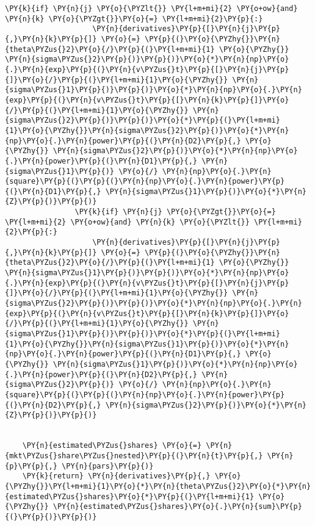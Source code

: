 \begin{tcolorbox}[breakable, size=fbox, boxrule=1pt, pad at break*=1mm,colback=cellbackground, colframe=cellborder]
\begin{Verbatim}[commandchars=\\\{\}]
                \PY{k}{if} \PY{n}{j} \PY{o}{\PYZlt{}} \PY{l+m+mi}{2} \PY{o+ow}{and} \PY{n}{k} \PY{o}{\PYZgt{}}\PY{o}{=} \PY{l+m+mi}{2}\PY{p}{:}
                    \PY{n}{derivatives}\PY{p}{[}\PY{n}{j}\PY{p}{,}\PY{n}{k}\PY{p}{]} \PY{o}{=} \PY{p}{(}\PY{o}{\PYZhy{}}\PY{n}{theta\PYZus{}2}\PY{o}{/}\PY{p}{(}\PY{l+m+mi}{1} \PY{o}{\PYZhy{}} \PY{n}{sigma\PYZus{}2}\PY{p}{)}\PY{p}{)}\PY{o}{*}\PY{n}{np}\PY{o}{.}\PY{n}{exp}\PY{p}{(}\PY{n}{v\PYZus{}t}\PY{p}{[}\PY{n}{j}\PY{p}{]}\PY{o}{/}\PY{p}{(}\PY{l+m+mi}{1}\PY{o}{\PYZhy{}} \PY{n}{sigma\PYZus{}1}\PY{p}{)}\PY{p}{)}\PY{o}{*}\PY{n}{np}\PY{o}{.}\PY{n}{exp}\PY{p}{(}\PY{n}{v\PYZus{}t}\PY{p}{[}\PY{n}{k}\PY{p}{]}\PY{o}{/}\PY{p}{(}\PY{l+m+mi}{1}\PY{o}{\PYZhy{}} \PY{n}{sigma\PYZus{}2}\PY{p}{)}\PY{p}{)}\PY{o}{*}\PY{p}{(}\PY{l+m+mi}{1}\PY{o}{\PYZhy{}}\PY{n}{sigma\PYZus{}2}\PY{p}{)}\PY{o}{*}\PY{n}{np}\PY{o}{.}\PY{n}{power}\PY{p}{(}\PY{n}{D2}\PY{p}{,} \PY{o}{\PYZhy{}} \PY{n}{sigma\PYZus{}2}\PY{p}{)}\PY{o}{*}\PY{n}{np}\PY{o}{.}\PY{n}{power}\PY{p}{(}\PY{n}{D1}\PY{p}{,} \PY{n}{sigma\PYZus{}1}\PY{p}{)} \PY{o}{/} \PY{n}{np}\PY{o}{.}\PY{n}{square}\PY{p}{(}\PY{p}{(}\PY{n}{np}\PY{o}{.}\PY{n}{power}\PY{p}{(}\PY{n}{D1}\PY{p}{,} \PY{n}{sigma\PYZus{}1}\PY{p}{)}\PY{o}{*}\PY{n}{Z}\PY{p}{)}\PY{p}{)}
                \PY{k}{if} \PY{n}{j} \PY{o}{\PYZgt{}}\PY{o}{=} \PY{l+m+mi}{2} \PY{o+ow}{and} \PY{n}{k} \PY{o}{\PYZlt{}} \PY{l+m+mi}{2}\PY{p}{:}
                    \PY{n}{derivatives}\PY{p}{[}\PY{n}{j}\PY{p}{,}\PY{n}{k}\PY{p}{]} \PY{o}{=} \PY{p}{(}\PY{o}{\PYZhy{}}\PY{n}{theta\PYZus{}2}\PY{o}{/}\PY{p}{(}\PY{l+m+mi}{1} \PY{o}{\PYZhy{}} \PY{n}{sigma\PYZus{}1}\PY{p}{)}\PY{p}{)}\PY{o}{*}\PY{n}{np}\PY{o}{.}\PY{n}{exp}\PY{p}{(}\PY{n}{v\PYZus{}t}\PY{p}{[}\PY{n}{j}\PY{p}{]}\PY{o}{/}\PY{p}{(}\PY{l+m+mi}{1}\PY{o}{\PYZhy{}} \PY{n}{sigma\PYZus{}2}\PY{p}{)}\PY{p}{)}\PY{o}{*}\PY{n}{np}\PY{o}{.}\PY{n}{exp}\PY{p}{(}\PY{n}{v\PYZus{}t}\PY{p}{[}\PY{n}{k}\PY{p}{]}\PY{o}{/}\PY{p}{(}\PY{l+m+mi}{1}\PY{o}{\PYZhy{}} \PY{n}{sigma\PYZus{}1}\PY{p}{)}\PY{p}{)}\PY{o}{*}\PY{p}{(}\PY{l+m+mi}{1}\PY{o}{\PYZhy{}}\PY{n}{sigma\PYZus{}1}\PY{p}{)}\PY{o}{*}\PY{n}{np}\PY{o}{.}\PY{n}{power}\PY{p}{(}\PY{n}{D1}\PY{p}{,} \PY{o}{\PYZhy{}} \PY{n}{sigma\PYZus{}1}\PY{p}{)}\PY{o}{*}\PY{n}{np}\PY{o}{.}\PY{n}{power}\PY{p}{(}\PY{n}{D2}\PY{p}{,} \PY{n}{sigma\PYZus{}2}\PY{p}{)} \PY{o}{/} \PY{n}{np}\PY{o}{.}\PY{n}{square}\PY{p}{(}\PY{p}{(}\PY{n}{np}\PY{o}{.}\PY{n}{power}\PY{p}{(}\PY{n}{D2}\PY{p}{,} \PY{n}{sigma\PYZus{}2}\PY{p}{)}\PY{o}{*}\PY{n}{Z}\PY{p}{)}\PY{p}{)}


    \PY{n}{estimated\PYZus{}shares} \PY{o}{=} \PY{n}{mkt\PYZus{}share\PYZus{}nested}\PY{p}{(}\PY{n}{t}\PY{p}{,} \PY{n}{p}\PY{p}{,} \PY{n}{pars}\PY{p}{)}
    \PY{k}{return} \PY{n}{derivatives}\PY{p}{,} \PY{o}{\PYZhy{}}\PY{l+m+mi}{1}\PY{o}{*}\PY{n}{theta\PYZus{}2}\PY{o}{*}\PY{n}{estimated\PYZus{}shares}\PY{o}{*}\PY{p}{(}\PY{l+m+mi}{1} \PY{o}{\PYZhy{}} \PY{n}{estimated\PYZus{}shares}\PY{o}{.}\PY{n}{sum}\PY{p}{(}\PY{p}{)}\PY{p}{)}


\end{Verbatim}
\end{tcolorbox}
